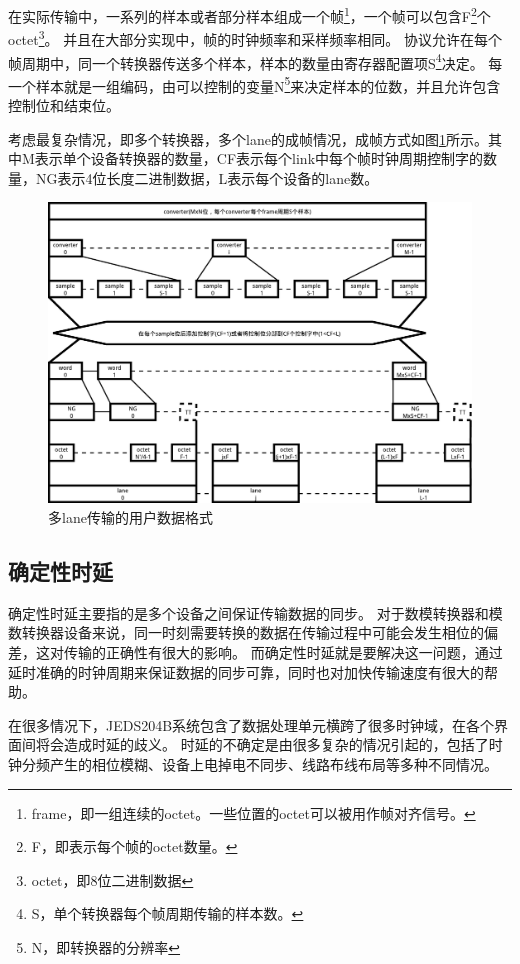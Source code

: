 \documentclass[UTF8]{ctexart}
\begin{document}
在实际传输中，一系列的样本或者部分样本组成一个帧\footnote{frame，即一组连续的octet。一些位置的octet可以被用作帧对齐信号。}，一个帧可以包含F\footnote{F，即表示每个帧的octet数量。}个octet\footnote{octet，即8位二进制数据}。
并且在大部分实现中，帧的时钟频率和采样频率相同。
协议允许在每个帧周期中，同一个转换器传送多个样本，样本的数量由寄存器配置项S\footnote{S，单个转换器每个帧周期传输的样本数。}决定。
每一个样本就是一组编码，由可以控制的变量N\footnote{N，即转换器的分辨率}来决定样本的位数，并且允许包含控制位和结束位。

考虑最复杂情况，即多个转换器，多个lane的成帧情况，成帧方式如图\ref{fig:user_data_format_for_multiple_lanes}所示。其中M表示单个设备转换器的数量，CF表示每个link中每个帧时钟周期控制字的数量，NG表示4位长度二进制数据，L表示每个设备的lane数。

\begin{figure}[H]
\centering
\includegraphics[width=17cm]{./img/user_data_format_for_multiple_lanes.pdf}
\caption{多lane传输的用户数据格式}
\label{fig:user_data_format_for_multiple_lanes}
\end{figure}

\subsection{确定性时延}

确定性时延主要指的是多个设备之间保证传输数据的同步。
对于数模转换器和模数转换器设备来说，同一时刻需要转换的数据在传输过程中可能会发生相位的偏差，这对传输的正确性有很大的影响。
而确定性时延就是要解决这一问题，通过延时准确的时钟周期来保证数据的同步可靠，同时也对加快传输速度有很大的帮助。

在很多情况下，JEDS204B系统包含了数据处理单元横跨了很多时钟域，在各个界面间将会造成时延的歧义。
时延的不确定是由很多复杂的情况引起的，包括了时钟分频产生的相位模糊、设备上电掉电不同步、线路布线布局等多种不同情况。
\end{document}
